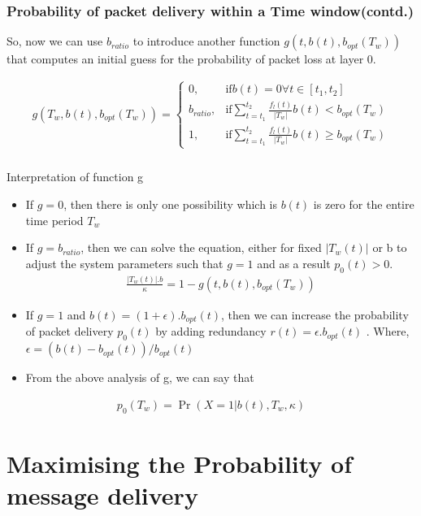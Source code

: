 \documentclass{beamer}
\providecommand{\abs}[1]{\vert#1\vert}
\providecommand{\pr}[1]{\ensuremath{\Pr\left(#1\right)}}
\begin{document}
\begin{frame}[fragile]
\frametitle{Probability of packet delivery within a Time window(contd.)}
So, now we can use $b_{ratio}$ to introduce another function $g(t, b(t), b_{opt}(T_w))$ that computes an initial guess for the probability of packet loss at layer 0.

\begin{block}{}
\begin{align}
  g(T_w, b(t), b_{opt}(T_w)) =  \begin{cases}
			0, & \text{if} b(t) = 0 \forall t \in [t_1,t_2] \\
            b_{ratio}, & \text{if}  \sum_{t=t_1}^{t_2} \frac{f_l(t)}{\abs{T_w}}b(t) < b_{opt}(T_w) \\
            1, & \text{if}  \sum_{t=t_1}^{t_2} \frac{f_l(t)}{\abs{T_w}}b(t) \geq b_{opt}(T_w)
		 \end{cases}  \label{Eq:7}
\end{align}
\end{block}
\end{frame}
\begin{frame}[fragile]
\frametitle{}
\begin{block}{Interpretation of function g}
\begin{itemize}
    \item If $g = 0$, then there is only one possibility which is $b(t)$ is zero for the entire time period $T_w$
    \item If $g = b_{ratio}$, then we can solve the equation, either for fixed $\abs{T_w(t)}$ or b to adjust the system parameters such that $g=1$ and as a result $p_0(t) > 0$.
    \begin{align}
      \frac{\abs{T_w(t)}.b}{\kappa} = 1 - g(t, b(t), b_{opt}(T_w))  \label{Eq:8}
    \end{align}
    \item If $g=1$ and $b(t) = (1+\epsilon).b_{opt}(t)$, then we can increase the probability of packet delivery $p_0(t)$ by adding redundancy $r(t) = \epsilon.b_{opt}(t)$ . Where, $\epsilon = (b(t) - b_{opt}(t)) / b_{opt}(t)$
    \item From the above analysis of g, we can say that 
\end{itemize}
\begin{align}
    p_0(T_w) = \pr{X = 1|b(t), T_w, \kappa} \label{Eq:9}
\end{align}
\end{block}
\end{frame}
\section{Maximising the Probability of message delivery}
\end{document}
